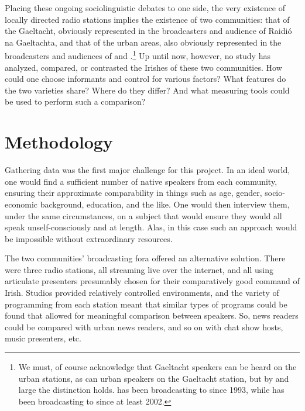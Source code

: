 \documentclass[output=paper,colorlinks,citecolor=brown]{langscibook}
\begin{document}
Placing these ongoing sociolinguistic debates to one side, the very existence of locally directed radio stations implies the existence of two communities: that of the Gaeltacht, obviously represented in the broadcasters and audience of Raidió na Gaeltachta, and that of the urban areas, also obviously represented in the broadcasters and audiences of  and .\footnote{We must, of course acknowledge that Gaeltacht speakers can be heard on the urban stations, as can urban speakers on the Gaeltacht station, but by and large the distinction holds.  has been broadcasting to  since 1993, while  has been broadcasting to  since at least 2002.} Up until now, however, no study has analyzed, compared, or contrasted the Irishes of these two communities. How could one choose informants and control for various factors? What features do the two varieties share? Where do they differ? And what measuring tools could be used to perform such a comparison?

\section{Methodology}

Gathering data was the first major challenge for this project. In an ideal world, one would find a sufficient number of native speakers from each community, ensuring their approximate comparability in things such as age, gender, socio-economic background, education, and the like. One would then interview them, under the same circumstances, on a subject that would ensure they would all speak unself-consciously and at length. Alas, in this case such an approach would be impossible without extraordinary resources.

The two communities' broadcasting fora offered an alternative solution. There were three radio stations, all streaming live over the internet, and all using articulate presenters presumably chosen for their comparatively good command of Irish. Studios provided relatively controlled environments, and the variety of programming from each station meant that similar types of programs could be found that allowed for meaningful comparison between speakers. So,  news readers could be compared with urban news readers, and so on with chat show hosts, music presenters, etc.
\end{document}
